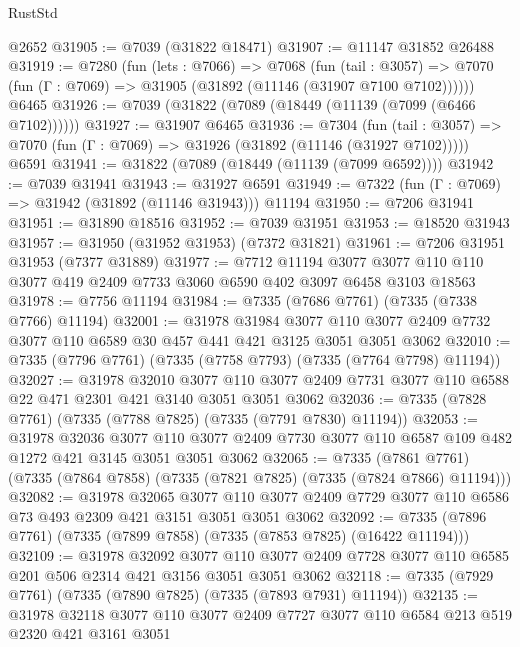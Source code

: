 \begin{lexlean}{RustStd}
\begin{coremodule}
    @2652
@31905 := @7039 (@31822 @18471)
@31907 := @11147 @31852 @26488
@31919 := @7280
    (fun (lets : @7066) =>
    @7068
      (fun (tail : @3057) =>
      @7070 (fun (Γ : @7069) => @31905 (@31892 (@11146 (@31907 @7100 @7102))))))
    @6465
@31926 := @7039 (@31822 (@7089 (@18449 (@11139 (@7099 (@6466 @7102))))))
@31927 := @31907 @6465
@31936 := @7304
    (fun (tail : @3057) => @7070 (fun (Γ : @7069) => @31926 (@31892 (@11146 (@31927 @7102)))))
    @6591
@31941 := @31822 (@7089 (@18449 (@11139 (@7099 @6592))))
@31942 := @7039 @31941
@31943 := @31927 @6591
@31949 := @7322 (fun (Γ : @7069) => @31942 (@31892 (@11146 @31943))) @11194
@31950 := @7206 @31941
@31951 := @31890 @18516
@31952 := @7039 @31951
@31953 := @18520 @31943
@31957 := @31950 (@31952 @31953) (@7372 @31821)
@31961 := @7206 @31951 @31953 (@7377 @31889)
@31977 := @7712
    @11194
    @3077
    @3077
    @110
    @110
    @3077
    @419
    @2409
    @7733
    @3060
    @6590
    @402
    @3097
    @6458
    @3103
    @18563
@31978 := @7756 @11194
@31984 := @7335 (@7686 @7761) (@7335 (@7338 @7766) @11194)
@32001 := @31978
    @31984
    @3077
    @110
    @3077
    @2409
    @7732
    @3077
    @110
    @6589
    @30
    @457
    @441
    @421
    @3125
    @3051
    @3051
    @3062
@32010 := @7335 (@7796 @7761) (@7335 (@7758 @7793) (@7335 (@7764 @7798) @11194))
@32027 := @31978
    @32010
    @3077
    @110
    @3077
    @2409
    @7731
    @3077
    @110
    @6588
    @22
    @471
    @2301
    @421
    @3140
    @3051
    @3051
    @3062
@32036 := @7335 (@7828 @7761) (@7335 (@7788 @7825) (@7335 (@7791 @7830) @11194))
@32053 := @31978
    @32036
    @3077
    @110
    @3077
    @2409
    @7730
    @3077
    @110
    @6587
    @109
    @482
    @1272
    @421
    @3145
    @3051
    @3051
    @3062
@32065 := @7335
    (@7861 @7761)
    (@7335 (@7864 @7858) (@7335 (@7821 @7825) (@7335 (@7824 @7866) @11194)))
@32082 := @31978
    @32065
    @3077
    @110
    @3077
    @2409
    @7729
    @3077
    @110
    @6586
    @73
    @493
    @2309
    @421
    @3151
    @3051
    @3051
    @3062
@32092 := @7335 (@7896 @7761) (@7335 (@7899 @7858) (@7335 (@7853 @7825) (@16422 @11194)))
@32109 := @31978
    @32092
    @3077
    @110
    @3077
    @2409
    @7728
    @3077
    @110
    @6585
    @201
    @506
    @2314
    @421
    @3156
    @3051
    @3051
    @3062
@32118 := @7335 (@7929 @7761) (@7335 (@7890 @7825) (@7335 (@7893 @7931) @11194))
@32135 := @31978
    @32118
    @3077
    @110
    @3077
    @2409
    @7727
    @3077
    @110
    @6584
    @213
    @519
    @2320
    @421
    @3161
    @3051

\end{coremodule}
\end{lexlean}
